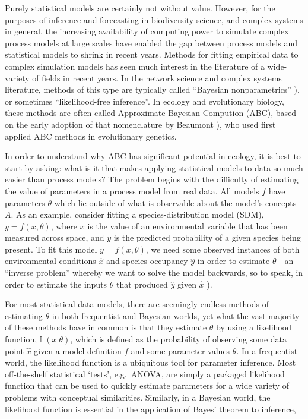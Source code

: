 \documentclass[]{article}
\begin{document}
Purely statistical models are certainly not without value. However, for
the purposes of inference and forecasting in biodiversity science, and
complex systems in general, the increasing availability of computing
power to simulate complex process models at large scales have enabled
the gap between process models and statistical models to shrink in
recent years. Methods for fitting empirical data to complex simulation
models has seen much interest in the literature of a wide-variety of
fields in recent years. In the network science and complex systems
literature, methods of this type are typically called ``Bayesian
nonparametrics'' \citep{orbanz}), or sometimes ``likelihood-free
inference''. In ecology and evolutionary biology, these methods are
often called Approximate Bayesian Compution (ABC), based on the early
adoption of that nomenclature by Beaumont \citep{beaumont}), who
used first applied ABC methods in evolutionary genetics.

In order to understand why ABC has significant potential in ecology, it
is best to start by asking: what is it that makes applying statistical
models to data so much easier than process models? The problem begins
with the difficulty of estimating the value of parameters in a process
model from real data. All models \(f\) have parameters \(\theta\) which
lie outside of what is observable about the model's concepts \(A\). As
an example, consider fitting a species-distribution model (SDM),
\(y = f(x, \theta)\), where \(x\) is the value of an environmental
variable that has been measured across space, and \(y\) is the predicted
probability of a given species being present. To fit this model
\(y =f(x, \theta)\), we need some observed instances of both
environmental conditions \(\hat{x}\) and species occupancy \(\hat{y}\)
in order to estimate \(\theta\)---an ``inverse problem'' whereby we want
to solve the model backwards, so to speak, in order to estimate the
inputs \(\theta\) that produced \(\hat{y}\) given \(\hat{x}\)
\citep{stouffer}).

For most statistical data models, there are seemingly endless methods of
estimating \(\theta\) in both frequentist and Bayesian worlds, yet what
the vast majority of these methods have in common is that they estimate
\(\theta\) by using a likelihood function, \(\mathbb{L}({x} | \theta)\),
which is defined as the probability of observing some data point
\(\hat{x}\) given a model definition \(f\) and some parameter values
\(\theta\). In a frequentist world, the likelihood function is a
ubiquitous tool for parameter inference. Most off-the-shelf statistical
`tests', e.g.~ANOVA, are simply a packaged likelihood function that can
be used to quickly estimate parameters for a wide variety of problems
with conceptual similarities. Similarly, in a Bayesian world, the
likelihood function is essential in the application of Bayes' theorem to
inference,
\end{document}
